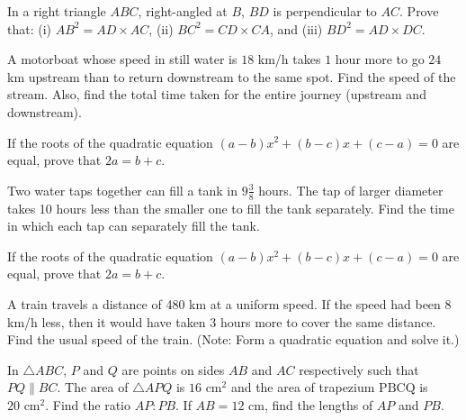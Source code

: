 \documentclass[12pt,a4paper]{exam}
\begin{document}
\begin{questions}
\question[4] In a right triangle $ABC$, right-angled at $B$, $BD$ is perpendicular to $AC$. Prove that: (i) $AB^2 = AD \times AC$, (ii) $BC^2 = CD \times CA$, and (iii) $BD^2 = AD \times DC$.
\vspace{0.15cm}

\question[4] A motorboat whose speed in still water is $18$ km/h takes $1$ hour more to go $24$ km upstream than to return downstream to the same spot. Find the speed of the stream. Also, find the total time taken for the entire journey (upstream and downstream).
\vspace{0.15cm}

\question[4] If the roots of the quadratic equation $(a-b)x^2 + (b-c)x + (c-a) = 0$ are equal, prove that $2a = b + c$.
\vspace{0.15cm}

\question[4] Two water taps together can fill a tank in $9\frac{3}{8}$ hours. The tap of larger diameter takes 10 hours less than the smaller one to fill the tank separately. Find the time in which each tap can separately fill the tank.
\vspace{0.15cm}

\question[4] If the roots of the quadratic equation $(a - b)x^2 + (b - c)x + (c - a) = 0$ are equal, prove that $2a = b + c$.
\vspace{0.15cm}

\question[5] A train travels a distance of 480 km at a uniform speed. If the speed had been 8 km/h less, then it would have taken 3 hours more to cover the same distance. Find the usual speed of the train. (Note: Form a quadratic equation and solve it.)
\vspace{0.15cm}

\question[4] In $\triangle ABC$, $P$ and $Q$ are points on sides $AB$ and $AC$ respectively such that $PQ \parallel BC$. The area of $\triangle APQ$ is $16 \text{ cm}^2$ and the area of trapezium $\text{PBCQ}$ is $20 \text{ cm}^2$. Find the ratio $AP:PB$. If $AB = 12$ cm, find the lengths of $AP$ and $PB$.
\vspace{0.15cm}

\end{questions}
\bigskip
\end{document}
